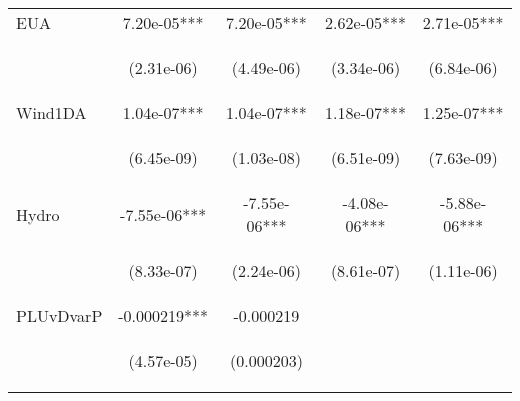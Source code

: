 \begin{center}
\begin{tabular}{lcccc}
EUA & 7.20e-05*** & 7.20e-05*** & 2.62e-05*** & 2.71e-05*** \\
\vspace{4pt} & \begin{footnotesize}(2.31e-06)\end{footnotesize} & \begin{footnotesize}(4.49e-06)\end{footnotesize} & \begin{footnotesize}(3.34e-06)\end{footnotesize} & \begin{footnotesize}(6.84e-06)\end{footnotesize} \\
Wind1DA & 1.04e-07*** & 1.04e-07*** & 1.18e-07*** & 1.25e-07*** \\
\vspace{4pt} & \begin{footnotesize}(6.45e-09)\end{footnotesize} & \begin{footnotesize}(1.03e-08)\end{footnotesize} & \begin{footnotesize}(6.51e-09)\end{footnotesize} & \begin{footnotesize}(7.63e-09)\end{footnotesize} \\
Hydro & -7.55e-06*** & -7.55e-06*** & -4.08e-06*** & -5.88e-06*** \\
\vspace{4pt} & \begin{footnotesize}(8.33e-07)\end{footnotesize} & \begin{footnotesize}(2.24e-06)\end{footnotesize} & \begin{footnotesize}(8.61e-07)\end{footnotesize} & \begin{footnotesize}(1.11e-06)\end{footnotesize} \\
PLUvDvarP & -0.000219*** & -0.000219 &  &  \\
\vspace{4pt} & \begin{footnotesize}(4.57e-05)\end{footnotesize} & \begin{footnotesize}(0.000203)\end{footnotesize} & \begin{footnotesize}\end{footnotesize} & \begin{footnotesize}\end{footnotesize} \\

\end{tabular}
\end{center}
